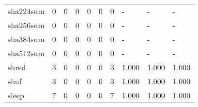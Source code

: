 \begin{longtable}{lp{1.3cm}p{1.3cm}p{1.3cm}p{1.3cm}p{1.3cm}p{1.3cm}p{1.3cm}p{1.3cm}p{1.3cm}}
sha224sum &                      0 &                                             0 &                                            0 &                                           0 &                                            0 &                                          0 &                                    - &                                      - &                                    - \\
sha256sum &                      0 &                                             0 &                                            0 &                                           0 &                                            0 &                                          0 &                                    - &                                      - &                                    - \\
sha384sum &                      0 &                                             0 &                                            0 &                                           0 &                                            0 &                                          0 &                                    - &                                      - &                                    - \\
sha512sum &                      0 &                                             0 &                                            0 &                                           0 &                                            0 &                                          0 &                                    - &                                      - &                                    - \\
shred     &                      3 &                                             0 &                                            0 &                                           0 &                                            0 &                                          3 &                                1.000 &                                  1.000 &                                1.000 \\
shuf      &                      3 &                                             0 &                                            0 &                                           0 &                                            0 &                                          3 &                                1.000 &                                  1.000 &                                1.000 \\
sleep     &                      7 &                                             0 &                                            0 &                                           0 &                                            0 &                                          7 &                                1.000 &                                  1.000 &                                1.000 \\

\end{longtable}
